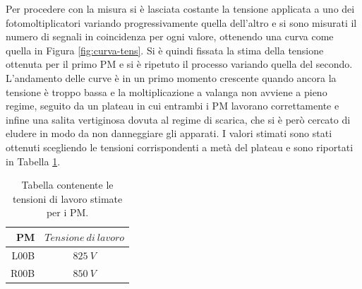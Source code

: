\documentclass{standalone}
\begin{document}
	Per procedere con la misura si \`e lasciata costante la tensione applicata a uno dei fotomoltiplicatori variando progressivamente quella dell'altro e si sono misurati il numero di segnali in coincidenza per ogni valore, ottenendo una curva come quella in Figura \ref{fig:curva-tens}. Si \`e quindi fissata la stima della tensione ottenuta per il primo PM e si \`e ripetuto il processo variando quella del secondo. L'andamento delle curve \`e in un primo momento crescente quando ancora la tensione \`e troppo bassa e la moltiplicazione a valanga non avviene a pieno regime, seguito da un plateau in cui entrambi i PM lavorano correttamente e infine una salita vertiginosa dovuta al regime di scarica, che si \`e per\`o cercato di eludere in modo da non danneggiare gli apparati. I valori stimati sono stati ottenuti scegliendo le tensioni corrispondenti a met\`a del plateau e sono riportati in Tabella \ref{tab:tension}.\\

	\begin{table}[h]                        %
		\begin{center}                          %
			\begin{tabular}{r|c}                  %
				\hline \hline                           %
				PM & $Tensione\ di \ lavoro$\\           %
				\hline                                  %
				L00B & $825\ V$ \\           %
				\hline                                  %
				R00B & $850\ V$ \\
				\hline \hline                           %
			\end{tabular}
      \caption{Tabella contenente le tensioni di lavoro stimate per i PM.}
			\label{tab:tension}
		\end{center}
	\end{table}
\end{document}
